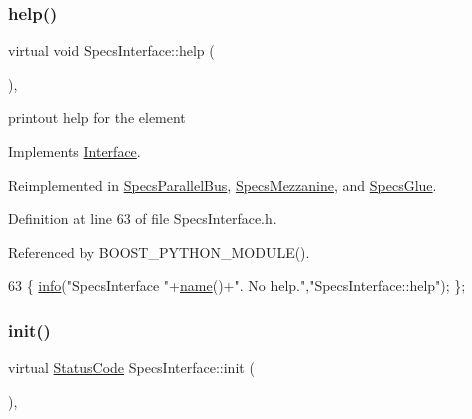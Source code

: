 \subsubsection{\texorpdfstring{help()}{help()}}
{\footnotesize\ttfamily virtual void Specs\+Interface\+::help (\begin{DoxyParamCaption}{ }\end{DoxyParamCaption})\hspace{0.3cm}{\ttfamily [inline]}, {\ttfamily [virtual]}}

printout help for the element 

Implements \hyperlink{classInterface_aedd3cf1d964c837e7848ccf81dc9c760}{Interface}.



Reimplemented in \hyperlink{classSpecsParallelBus_a67b05d066de051d33a6afff267f9178e}{Specs\+Parallel\+Bus}, \hyperlink{classSpecsMezzanine_a9cbb99c91d987194009be1cb81d2ba7c}{Specs\+Mezzanine}, and \hyperlink{classSpecsGlue_a04fd0c122ac6980833fd87af92377791}{Specs\+Glue}.



Definition at line 63 of file Specs\+Interface.\+h.



Referenced by B\+O\+O\+S\+T\+\_\+\+P\+Y\+T\+H\+O\+N\+\_\+\+M\+O\+D\+U\+L\+E().


\begin{DoxyCode}
63 \{ \hyperlink{classObject_a644fd329ea4cb85f54fa6846484b84a8}{info}(\textcolor{stringliteral}{"SpecsInterface "}+\hyperlink{classObject_a300f4c05dd468c7bb8b3c968868443c1}{name}()+\textcolor{stringliteral}{". No help."},\textcolor{stringliteral}{"SpecsInterface::help"}); \};
\end{DoxyCode}
\mbox{\label{classSpecsInterface_a99ec05cbe0d15892afbec6feaf33c89b}} 
\subsubsection{\texorpdfstring{init()}{init()}}
{\footnotesize\ttfamily virtual \hyperlink{classStatusCode}{Status\+Code} Specs\+Interface\+::init (\begin{DoxyParamCaption}{ }\end{DoxyParamCaption})\hspace{0.3cm}{\ttfamily [inline]}, {\ttfamily [virtual]}}


